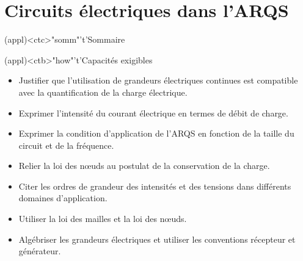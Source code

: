 \documentclass[../../main/main.tex]{subfiles}
\begin{document}
\setcounter{chapter}{0}


\chapter{Circuits électriques dans l'ARQS}

\vspace*{\fill}

\begin{tcn}(appl)<ctc>"somm"'t'{Sommaire}
	\let\item\olditem
	\vspace{-15pt}
	\minitoc
	\vspace{-25pt}
\end{tcn}

\begin{tcn}[sidebyside](appl)<ctb>"how"'t'{Capacités exigibles}
	\begin{itemize}[label=\rcheck]
		\item Justifier que l'utilisation de grandeurs électriques
		      continues est compatible avec la quantification de la charge
		      électrique.
		\item Exprimer l'intensité du courant électrique en termes de débit de
		      charge.
		\item Exprimer la condition d’application de l'ARQS en fonction de la
		      taille du circuit et de la fréquence.
	\end{itemize}
	\tcblower
	\begin{itemize}[label=\rcheck]
		\item Relier la loi des nœuds au postulat de la conservation de la charge.
		\item Citer les ordres de grandeur des intensités et des tensions dans
		      différents domaines d'application.
		\item Utiliser la loi des mailles et la loi des nœuds.
		\item Algébriser les grandeurs électriques et utiliser les conventions
		      récepteur et générateur.
	\end{itemize}
\end{tcn}

\vspace*{\fill}
\newpage
\vspace*{\fill}
\end{document}
